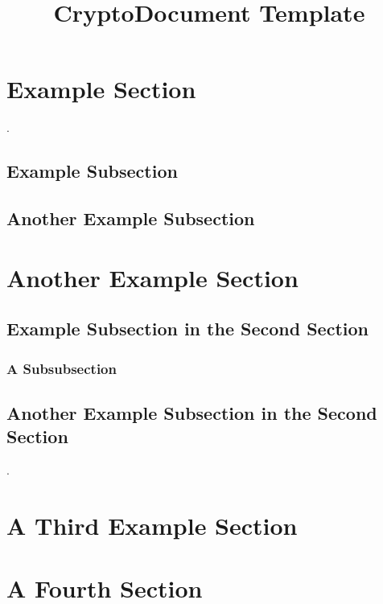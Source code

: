 \documentclass[ieee-conf-proceedings]{cryptodocument}
\title{CryptoDocument Template}
\begin{document}
\maketitle

\begin{abstract}
    \blindtext
\end{abstract}

\tableofcontents

\section{Example Section}
\blindtext \cite{einstein}.

\subsection{Example Subsection}
\blindtext

\subsection{Another Example Subsection}
\blindtext

\section{Another Example Section}

\blindtext

\subsection{Example Subsection in the Second Section}
\blindtext

\subsubsection{A Subsubsection}
\blindtext

\subsection{Another Example Subsection in the Second Section}
\blindtext \cite{dirac}.

\section{A Third Example Section}

\blindtext

\section{A Fourth Section}
\end{document}
